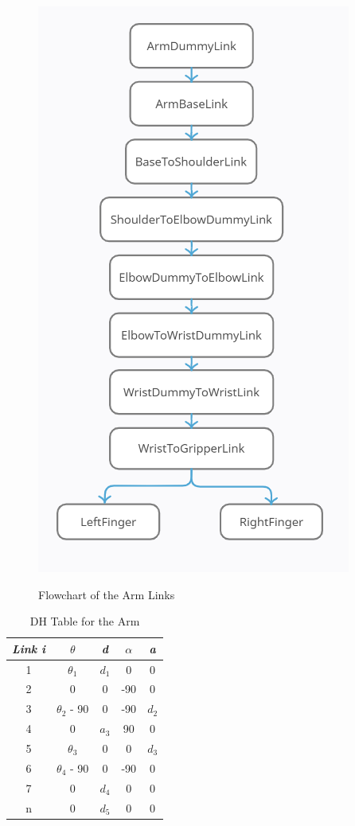 \begin{figure}[H]
	\centering
	\includegraphics[scale=0.75]{sections/robot-design/images/arm_link_diagram.png}
	\label{sample_return_rover:robot_design:arm_diagram}
	\caption{Flowchart of the Arm Links}
\end{figure}

\begin{table}[htbp]
	\centering
	\begin{tabular}{|c|c|c|c|c|}
		\hline
		\textit{Link i} & \textit{$\theta$} & \textit{d} & \textit{$\alpha$} & \textit{a}\\
		\hline
		1 & $\theta_{1}$ & $d_{1}$ & 0 & 0 \\
		2 & 0 & 0 & -90 & 0 \\
		3 & $\theta_{2}$ - 90  & 0 & -90 & $d_{2}$ \\
		4 & 0  & $a_{3}$ & 90 & 0 \\
		5 & $\theta_{3}$ & 0 & 0 & $d_{3}$ \\
		6 & $\theta_{4}$ - 90 & 0 & -90 & 0 \\
		7 & 0 & $d_{4}$ & 0 & 0 \\
		n & 0 & $d_{5}$ & 0 & 0 \\
		\hline
	\end{tabular}
	\label{sample_return_rover:robot_design:dh}
	\caption{DH Table for the Arm}
\end{table}


